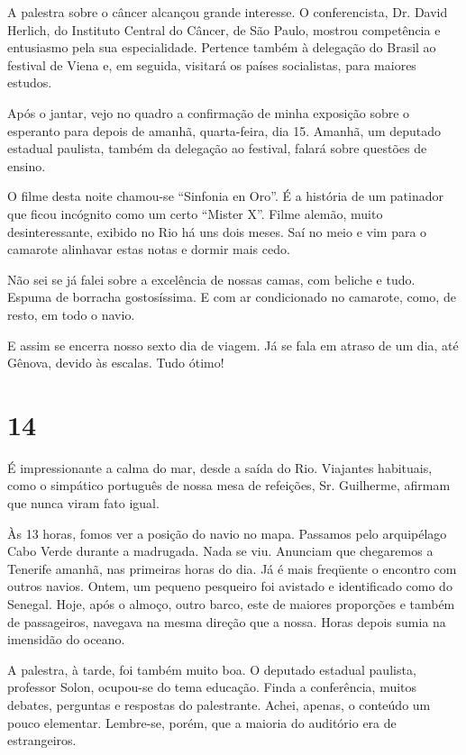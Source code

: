 A palestra sobre o câncer alcançou grande interesse. O conferencista, Dr. David Herlich, do Instituto Central do Câncer, de São Paulo, mostrou competência e entusiasmo pela sua especialidade. Pertence também à delegação do Brasil ao festival de Viena e, em seguida, visitará os países socialistas, para maiores estudos.

Após o jantar, vejo no quadro a confirmação de minha exposição sobre o esperanto para depois de amanhã, quarta-feira, dia 15. Amanhã, um deputado estadual paulista, também da delegação ao festival, falará sobre questões de ensino.

O filme desta noite chamou-se “Sinfonia en Oro”. É a história de um patinador que ficou incógnito como um certo “Mister X”. Filme alemão, muito desinteressante, exibido no Rio há uns dois meses. Saí no meio e vim para o camarote alinhavar estas notas e dormir mais cedo.

Não sei se já falei sobre a excelência de nossas camas, com beliche e tudo. Espuma de borracha gostosíssima. E com ar condicionado no camarote, como, de resto, em todo o navio.

E assim se encerra nosso sexto dia de viagem. Já se fala em atraso de um dia, até Gênova, devido às escalas. Tudo ótimo!


\section*{14 \adfflatleafright {}}

É impressionante a calma do mar, desde a saída do Rio. Viajantes habituais, como o simpático português de nossa mesa de refeições, Sr. Guilherme, afirmam que nunca viram fato igual.

Às 13 horas, fomos ver a posição do navio no mapa. Passamos pelo arquipélago Cabo Verde durante a madrugada. Nada se viu. Anunciam que chegaremos a Tenerife amanhã, nas primeiras horas do dia. Já é mais freqüente o encontro com outros navios. Ontem, um pequeno pesqueiro foi avistado e identificado como do Senegal. Hoje, após o almoço, outro barco, este de maiores proporções e também de passageiros, navegava na mesma direção que a nossa. Horas depois sumia na imensidão do oceano.

A palestra, à tarde, foi também muito boa. O deputado estadual paulista, professor Solon, ocupou-se do tema educação. Finda a conferência, muitos debates, perguntas e respostas do palestrante. Achei, apenas, o conteúdo um pouco elementar. Lembre-se, porém, que a maioria do auditório era de estrangeiros.


